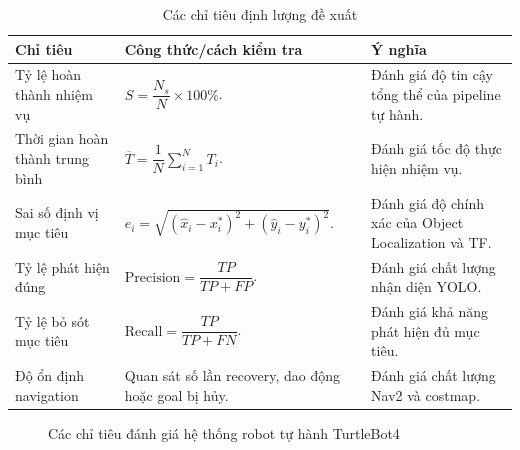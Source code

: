 \begin{table}[H]
    \centering
    \caption{Các chỉ tiêu định lượng đề xuất}
    \label{tab:quantitative-metrics}
    \renewcommand{\arraystretch}{1.25}
    \small
    \begin{tabularx}{\textwidth}{|>{\raggedright\arraybackslash}p{}|>{\raggedright\arraybackslash}p{}|>{\raggedright\arraybackslash}X|}
        \hline
        \textbf{Chỉ tiêu} & \textbf{Công thức/cách kiểm tra} & \textbf{Ý nghĩa} \\
        \hline
        Tỷ lệ hoàn thành nhiệm vụ & $S=\dfrac{N_s}{N}\times 100\%$. & Đánh giá độ tin cậy tổng thể của pipeline tự hành. \\
        \hline
        Thời gian hoàn thành trung bình & $\overline{T}=\dfrac{1}{N}\sum_{i=1}^{N}T_i$. & Đánh giá tốc độ thực hiện nhiệm vụ. \\
        \hline
        Sai số định vị mục tiêu & $e_i=\sqrt{(\widehat{x}_i-x_i^*)^2+(\widehat{y}_i-y_i^*)^2}$. & Đánh giá độ chính xác của Object Localization và TF. \\
        \hline
        Tỷ lệ phát hiện đúng & $\mathrm{Precision}=\dfrac{TP}{TP+FP}$. & Đánh giá chất lượng nhận diện YOLO. \\
        \hline
        Tỷ lệ bỏ sót mục tiêu & $\mathrm{Recall}=\dfrac{TP}{TP+FN}$. & Đánh giá khả năng phát hiện đủ mục tiêu. \\
        \hline
        Độ ổn định navigation & Quan sát số lần recovery, dao động hoặc goal bị hủy. & Đánh giá chất lượng Nav2 và costmap. \\
        \hline
    \end{tabularx}
\end{table}

\begin{figure}[H]
\centering
{}
\caption{Các chỉ tiêu đánh giá hệ thống robot tự hành TurtleBot4}
\label{fig:evaluation-metrics}
\end{figure}

